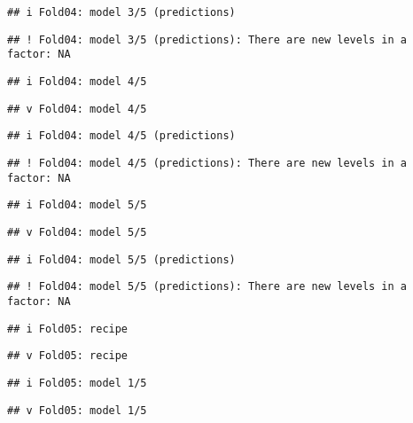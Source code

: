\documentclass[
]{article}
\begin{document}
\begin{verbatim}
## i Fold04: model 3/5 (predictions)
\end{verbatim}

\begin{verbatim}
## ! Fold04: model 3/5 (predictions): There are new levels in a factor: NA
\end{verbatim}

\begin{verbatim}
## i Fold04: model 4/5
\end{verbatim}

\begin{verbatim}
## v Fold04: model 4/5
\end{verbatim}

\begin{verbatim}
## i Fold04: model 4/5 (predictions)
\end{verbatim}

\begin{verbatim}
## ! Fold04: model 4/5 (predictions): There are new levels in a factor: NA
\end{verbatim}

\begin{verbatim}
## i Fold04: model 5/5
\end{verbatim}

\begin{verbatim}
## v Fold04: model 5/5
\end{verbatim}

\begin{verbatim}
## i Fold04: model 5/5 (predictions)
\end{verbatim}

\begin{verbatim}
## ! Fold04: model 5/5 (predictions): There are new levels in a factor: NA
\end{verbatim}

\begin{verbatim}
## i Fold05: recipe
\end{verbatim}

\begin{verbatim}
## v Fold05: recipe
\end{verbatim}

\begin{verbatim}
## i Fold05: model 1/5
\end{verbatim}

\begin{verbatim}
## v Fold05: model 1/5
\end{verbatim}
\end{document}
